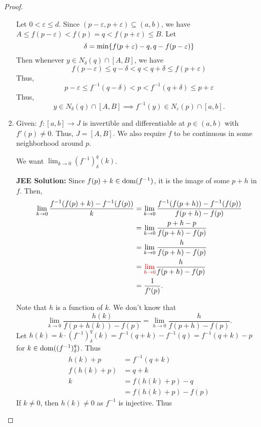 \begin{proof}
\begin{enumerate}[label=(\roman*)]
        Let $0 < \varepsilon \leq d$.
        Since $(p - \varepsilon, p + \varepsilon) \subseteq (a, b)$, we have $A \leq f(p - \varepsilon) < f(p) = q < f(p + \varepsilon) \leq B$.
        Let \[
            \delta = \min \set{f(p + \varepsilon) - q, q - f(p - \varepsilon)}
        \]
        Then whenever $y \in N_{\delta}(q) \cap [A, B]$, we have \[
            f(p - \varepsilon) \leq q - \delta < q < q + \delta \leq f(p + \varepsilon)
        \] Thus, \[
            p - \varepsilon \leq f^{-1}(q - \delta) < p < f^{-1}(q + \delta) \leq p + \varepsilon
        \] Thus, \[
            y \in N_{\delta}(q) \cap [A, B] \implies f^{-1}(y) \in N_{\varepsilon}(p) \cap [a, b].
        \]

        \item Given: $f : [a, b] \to J$ is invertible and differentiable at $p \in (a, b)$ with $f'(p) \neq 0$.
        Thus, $J = [A, B]$.
        We also require $f$ to be continuous in some neighborhood around $p$.

        We want $\lim_{k \to 0} (f^{-1})^{q}_{\delta}(k)$.

        \textbf{JEE Solution:} Since $f(p) + k \in \operatorname{dom} (f^{-1})$, it is the image of some $p + h$ in $f$.
        Then,
        \begin{align*}
            \lim_{k \to 0} \frac{f^{-1}(f(p) + k) - f^{-1}(f(p))}{k} &= \lim_{k \to 0} \frac{f^{-1}(f(p + h)) - f^{-1}(f(p))}{f(p + h) - f(p)} \\
            &= \lim_{k \to 0} \frac{p + h - p}{f(p + h) - f(p)} \\
            &= \lim_{k \to 0} \frac{h}{f(p + h) - f(p)} \\
            &= \textcolor{exercise}{\lim_{h \to 0}} \frac{h}{f(p + h) - f(p)} \\
            &= \frac{1}{f'(p)}.
        \end{align*}

        Note that $h$ is a function of $k$.
        We don't know that \[
            \lim_{k \to 0} \frac{h(k)}{f(p + h(k)) - f(p)} = \lim_{h \to 0} \frac{h}{f(p + h) - f(p)}.
        \]
        Let $h(k) = k \cdot (f^{-1})^{q}_{\delta}(k) = f^{-1}(q + k) - f^{-1}(q) = f^{-1}(q + k) - p$ for $k \in \operatorname{dom} ((f^{-1})^{q}_{\delta})$.
        Thus
        \begin{align*}
            h(k) + p &= f^{-1}(q + k) \\
            f(h(k) + p) &= q + k \\
            k &= f(h(k) + p) - q \\
            &= f(h(k) + p) - f(p)
        \end{align*}
        If $k \neq 0$, then $h(k) \neq 0$ as $f^{-1}$ is injective.
        Thus 


\end{enumerate}
\end{proof}
